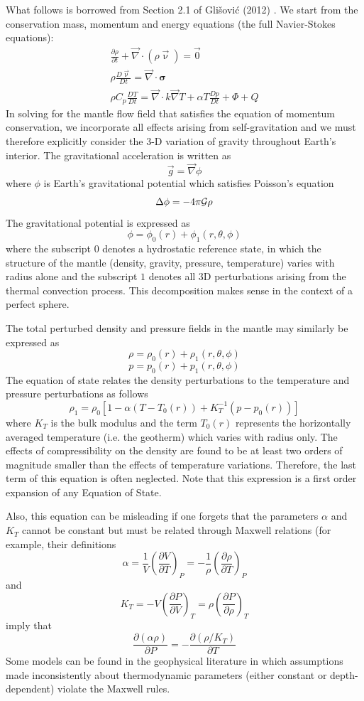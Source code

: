 What follows is borrowed from Section 2.1 of Gli{\v{s}}ovi{\'c} \etal (2012) \cite{glfm12}.
We start from the conservation mass, momentum and energy equations (the full Navier-Stokes equations):
\begin{eqnarray}
\frac{\partial \rho}{\partial t} + \vec\nabla \cdot (\rho \vec\upnu) = \vec{0} \\
\rho \frac{D\vec\upnu}{Dt} = \vec\nabla\cdot {\bm \sigma} \\
\rho C_p \frac{D T}{Dt} = \vec\nabla \cdot k \vec\nabla T + \alpha T \frac{Dp}{Dt} + \Phi + Q
\end{eqnarray}
In solving for the mantle flow field that satisfies the equation of momentum conservation, 
we incorporate all effects arising from
self-gravitation and we must therefore explicitly consider the 3-D variation of 
gravity throughout Earth’s interior. The
gravitational acceleration is written as
\[
\vec{g} = \vec\nabla \phi
\]
where $\phi$ is Earth’s gravitational potential which satisfies Poisson's equation
\[
\Delta \phi = - 4 \pi {\cal G} \rho
\]
The gravitational potential is expressed as
\[
\phi = \phi_0(r) + \phi_1(r,\theta,\phi)
\]
where the subscript $0$ denotes a hydrostatic reference state, 
in which the structure of the mantle (density, gravity, pressure, temperature) varies
with radius alone and the subscript $1$ denotes all 3D perturbations arising from the 
thermal convection process. This decomposition makes sense in the context of a perfect sphere.

The total perturbed density and pressure fields in the mantle may similarly be expressed as
\[
\rho = \rho_0(r) + \rho_1(r,\theta,\phi)
\]
\[
p = p_0(r) + p_1(r,\theta,\phi)
\]
The equation of state relates the density perturbations to the temperature and pressure perturbations 
as follows
\[
\rho_1 = \rho_0[1-\alpha(T-T_0(r))+K_T^{-1} (p-p_0(r))] 
\]
where $K_T$ is the bulk modulus and the term $T_0(r)$ represents the horizontally averaged temperature (i.e.
the geotherm) which varies with radius only. 
The effects of compressibility on the density are found to be at least two orders of magnitude
smaller than the effects of temperature variations. Therefore, the last term 
of this equation is often neglected.
Note that this expression is a first order expansion of any Equation of State. 

Also, this equation can be misleading if one forgets that the parameters $\alpha$ and $K_T$
cannot be constant but must be related through Maxwell relations (for example,
their definitions 
\[
\alpha = \frac{1}{V} \left( \frac{\partial V}{\partial T} \right)_P 
= -\frac{1}{\rho} \left( \frac{\partial \rho}{\partial T} \right)_P
\]
and 
\[
K_T 
= - V \left( \frac{\partial P}{\partial V} \right)_T
= \rho \left( \frac{\partial P}{\partial \rho} \right)_T
\]
imply that 
\[
\frac{\partial (\alpha\rho)}{\partial P}
= 
-\frac{\partial (\rho/K_T)}{\partial T}
\]
Some models can be found in the geophysical literature in which assumptions made inconsistently
about thermodynamic parameters (either constant or depth-dependent) violate the Maxwell rules.

